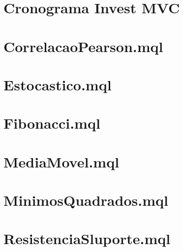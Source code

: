 \begin{apendicesenv}

\partapendices

\chapter{}


\chapter{}


\chapter{}


\chapter{}


\chapter{}


\chapter{}


\chapter{Cronograma Invest MVC}
\chapter{CorrelacaoPearson.mql}


\chapter{Estocastico.mql}


\chapter{Fibonacci.mql}


\chapter{MediaMovel.mql}


\chapter{MinimosQuadrados.mql}


\chapter{ResistenciaSluporte.mql}

\end{apendicesenv}
